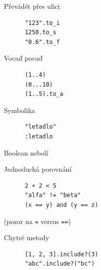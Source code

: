\documentclass{beamer}
\begin{document}
\begin{frame}[fragile]{}
  \begin{block}{Převádět přes ulici}
    \begin{verbatim}
      "123".to_i
      1250.to_s
      "0.6".to_f
    \end{verbatim}
  \end{block}
  \pause
\end{frame}

\begin{frame}[fragile]{}
  \begin{block}{Vocaď pocaď}
    \begin{verbatim}
      (1..4)
      (0...10)
      (1..5).to_a
    \end{verbatim}
  \end{block}
  \pause
  \begin{block}{Symbolika}
    \begin{verbatim}
      "letadlo"
      :letadlo
    \end{verbatim}
  \end{block}
\end{frame}

\begin{frame}[fragile]{Boolean nebolí}
  \begin{block}{Jednoduchá porovnání}
    \begin{verbatim}
      2 + 2 < 5
      "alfa" != "beta"
      (x == y) and (y == z)
    \end{verbatim}
  \end{block}
  (pozor na \texttt{=} versus \texttt{==})
  \pause
  \begin{block}{Chytré metody}
    \begin{verbatim}
      [1, 2, 3].include?(3)
      "abc".include?("bc")
    \end{verbatim}
  \end{block}
\end{frame}
\end{document}
